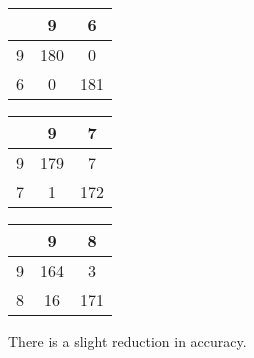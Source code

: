 \documentclass[12pt]{article}
\begin{document}
\begin{multicols}{3}
			\begin{tabular}{| c | c | c |}
				\hline
				& 9 & 6 \\ 
				\hline
				9 & 180 & 0 \\ 
				\hline
				6 & 0 & 181 \\ 
				\hline
			\end{tabular}
			\newline


			\begin{tabular}{| c | c | c |}
				\hline
				& 9 & 7 \\ 
				\hline
				9 & 179 & 7 \\ 
				\hline
				7 & 1 & 172 \\ 
				\hline
			\end{tabular}
			\newline


			\begin{tabular}{| c | c | c |}
				\hline
				& 9 & 8 \\ 
				\hline
				9 & 164 & 3 \\ 
				\hline
				8 & 16 & 171 \\ 
				\hline
			\end{tabular}
			\newline
              
        \end{multicols}
    There is a slight reduction in accuracy.  
\end{document}
